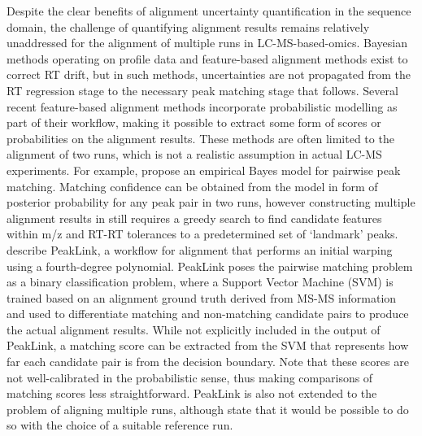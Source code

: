 Despite the clear benefits of alignment uncertainty quantification in the sequence domain, the challenge of quantifying alignment results remains relatively unaddressed for the alignment of multiple runs in LC-MS-based-omics. Bayesian methods operating on profile data \cite[e.g.\ ][]{Listgarten2004, Kong2009, Tsai2013a} and feature-based alignment methods \cite[e.g.\ ][]{Fischer2006, Pluskal2010, Voss2011a} exist to correct RT drift, but in such methods, uncertainties are not propagated from the RT regression stage to the necessary peak matching stage that follows. Several recent feature-based alignment methods incorporate probabilistic modelling as part of their workflow, making it possible to extract some form of scores or probabilities on the alignment results. These methods are often limited to the alignment of two runs, which is not a realistic assumption in actual LC-MS experiments. For example, \cite{Jeong2012} propose an empirical Bayes model for pairwise peak matching. Matching confidence can be obtained from the model in form of posterior probability for any peak pair in two runs, however constructing multiple alignment results in \cite{Jeong2012} still requires a greedy search to find candidate features within m/z and RT-RT tolerances to a predetermined set of `landmark' peaks. \cite{GhanatBari2014b} describe PeakLink, a workflow for alignment that performs an initial warping using a fourth-degree polynomial. PeakLink poses the pairwise matching problem as a binary classification problem, where a Support Vector Machine (SVM) is trained based on an alignment ground truth derived from MS-MS information and used to differentiate matching and non-matching candidate pairs to produce the actual alignment results. While not explicitly included in the output of PeakLink, a matching score can be extracted from the SVM that represents how far each candidate pair is from the decision boundary. Note that these scores are not well-calibrated in the probabilistic sense, thus making comparisons of matching scores less straightforward. PeakLink is also not extended to the problem of aligning multiple runs, although \cite{GhanatBari2014b} state that it would be possible to do so with the choice of a suitable reference run.

